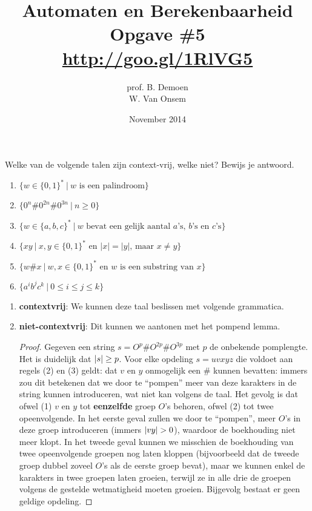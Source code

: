 \documentclass[a4paper]{article}
\title{Automaten en Berekenbaarheid\\Opgave \#5\\\url{http://goo.gl/1RlVG5}}
\author{prof. B. Demoen\\W. Van Onsem}
\date{November 2014}
\begin{document}
\maketitle

\begin{question}
Welke van de volgende talen zijn context-vrij, welke niet? Bewijs je antwoord.
  \begin{enumerate}
		    \item $\{ w \in \{0,1\}^* \ | \ \text{$w$ is een palindroom}\}$
      \item $\{ 0^n\#0^{2n}\#0^{3n} \ | \ n \geq 0 \}$
      \item $\{ w \in \{a,b,c\}^* \ | \ \text{$w$ bevat een gelijk aantal $a$'s, $b$'s en $c$'s} \}$
      \item $\{ xy \ | \ \text{$x,y \in \{0,1\}^*$ en $|x| = |y|$, maar $x \neq y$} \}$
      \item $\{ w \# x \ | \ \text{$w,x \in \{0,1\}^*$ en $w$ is een substring van $x$} \}$
		    \item $\{a^ib^jc^k \ | \ 0 \leq i \leq j \leq k \}$
  \end{enumerate}
\begin{answer}
\begin{enumerate}~~
\item \textbf{contextvrij}: We kunnen deze taal beslissen met volgende grammatica.
\item \textbf{niet-contextvrij}: Dit kunnen we aantonen met het pompend lemma.
\begin{proof}
Gegeven een string $s=O^p\#O^{2p}\#O^{3p}$ met $p$ de onbekende pomplengte. Het is duidelijk dat $\left|s\right|\geq p$. Voor elke opdeling $s=uvxyz$ die voldoet aan regels (2) en (3) geldt: dat $v$ en $y$ onmogelijk een $\#$ kunnen bevatten: immers zou dit betekenen dat we door te ``pompen'' meer van deze karakters in de string kunnen introduceren, wat niet kan volgens de taal. Het gevolg is dat ofwel (1) $v$ en $y$ tot \textbf{eenzelfde} groep $O$'s behoren, ofwel (2) tot twee opeenvolgende. In het eerste geval zullen we door te ``pompen'', meer $O$'s in deze groep introduceren (immers $\abs{vy}>0$), waardoor de boekhouding niet meer klopt. In het tweede geval kunnen we misschien de boekhouding van twee opeenvolgende groepen nog laten kloppen (bijvoorbeeld dat de tweede groep dubbel zoveel $O$'s als de eerste groep bevat), maar we kunnen enkel de karakters in twee groepen laten groeien, terwijl ze in alle drie de groepen volgens de gestelde wetmatigheid moeten groeien. Bijgevolg bestaat er geen geldige opdeling.

\end{proof}
\end{enumerate}
\end{answer}
\end{question}
\end{document}
